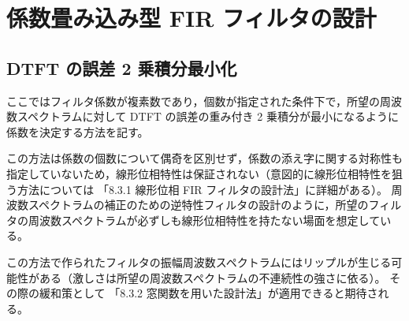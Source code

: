 \section{係数畳み込み型 FIR フィルタの設計}
    \subsection{DTFT の誤差 2 乗積分最小化}
        \newcommand{\Hideal}{H_\text{ideal}}
        \newcommand{\vhOpt}{\bm{h}_\text{opt}}
        ここではフィルタ係数が複素数であり，個数が指定された条件下で，所望の周波数スペクトラムに対して DTFT の誤差の重み付き 2 乗積分が最小になるように係数を決定する方法を記す。
        \par
        この方法は係数の個数について偶奇を区別せず，係数の添え字に関する対称性も指定していないため，線形位相特性は保証されない（意図的に線形位相特性を狙う方法については \cite{learn_sp_from_basic} 「8.3.1 線形位相 FIR フィルタの設計法」に詳細がある）。
        周波数スペクトラムの補正のための逆特性フィルタの設計のように，所望のフィルタの周波数スペクトラムが必ずしも線形位相特性を持たない場面を想定している。
        \par
        この方法で作られたフィルタの振幅周波数スペクトラムにはリップルが生じる可能性がある（激しさは所望の周波数スペクトラムの不連続性の強さに依る）。
        その際の緩和策として \cite{learn_sp_from_basic} 「8.3.2 窓関数を用いた設計法」が適用できると期待される。
